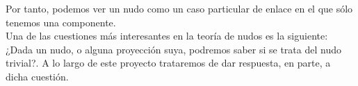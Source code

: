     Por tanto, podemos ver un nudo como un caso particular de enlace en el que sólo tenemos una componente.\\
    
  Una de las cuestiones más interesantes en la teoría de nudos es la siguiente: \\
  ¿Dada un nudo, o alguna proyección suya, podremos saber si se trata del nudo trivial?. A lo largo de este proyecto trataremos de dar respuesta, en parte, a dicha cuestión.\\
  